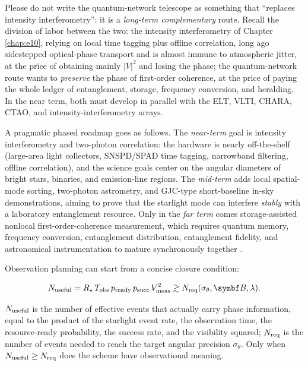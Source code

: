 Please do not write the quantum-network telescope as something that ``replaces intensity interferometry'': it is a \emph{long-term complementary} route. Recall the division of labor between the two: the intensity interferometry of Chapter \ref{chap:e10}, relying on local time tagging plus offline correlation, long ago sidestepped optical-phase transport and is almost immune to atmospheric jitter, at the price of obtaining mainly \(|V|^2\) and losing the phase; the quantum-network route wants to \emph{preserve} the phase of first-order coherence, at the price of paying the whole ledger of entanglement, storage, frequency conversion, and heralding. In the near term, both must develop in parallel with the ELT, VLTI, CHARA, CTAO, and intensity-interferometry arrays.

A pragmatic phased roadmap goes as follows. The \emph{near-term} goal is intensity interferometry and two-photon correlation: the hardware is nearly off-the-shelf (large-area light collectors, SNSPD/SPAD time tagging, narrowband filtering, offline correlation), and the science goals center on the angular diameters of bright stars, binaries, and emission-line regions. The \emph{mid-term} adds local spatial-mode sorting, two-photon astrometry, and GJC-type short-baseline in-sky demonstrations, aiming to prove that the starlight mode can interfere \emph{stably} with a laboratory entanglement resource. Only in the \emph{far term} comes storage-assisted nonlocal first-order-coherence measurement, which requires quantum memory, frequency conversion, entanglement distribution, entanglement fidelity, and astronomical instrumentation to mature synchronously together \citep{1956Natur.178.1046H,2023OExpr..3144246C,2024SPIE13095E..1NR,2026Natur.651..326S}.

Observation planning can start from a concise closure condition:

\begin{equation}
  N_{\rm useful}
  =
  R_\star\,T_{\rm obs}\,
  p_{\rm ready}\,p_{\rm succ}\,V_{\rm meas}^2
  \gtrsim
  N_{\rm req}(\sigma_\theta,\bm{B},\lambda) .
  \label{eq:e24-useful-events}
\end{equation}
\begin{formulaexplain}
\(N_{\rm useful}\) is the number of effective events that actually carry phase information, equal to the product of the starlight event rate, the observation time, the resource-ready probability, the success rate, and the visibility squared; \(N_{\rm req}\) is the number of events needed to reach the target angular precision \(\sigma_\theta\). Only when \(N_{\rm useful}\ge N_{\rm req}\) does the scheme have observational meaning.
\end{formulaexplain}

